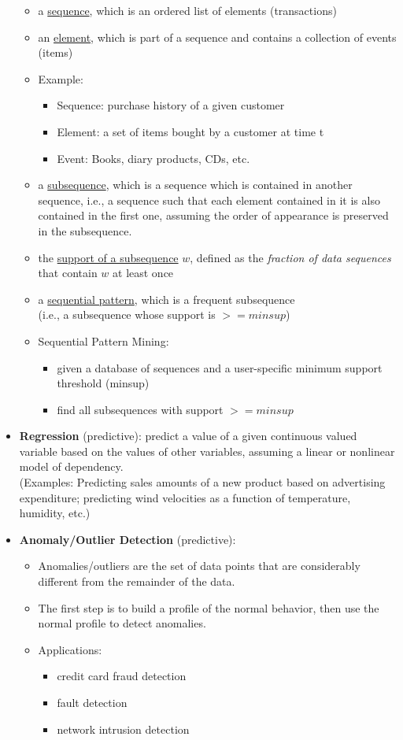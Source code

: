 \documentclass[10pt,a4paper]{article}
\begin{document}
\begin{justify}
\begin{itemize}
	\begin{itemize}
		\item a \uline{sequence}, which is an ordered list of elements (transactions)
		\item an \uline{element}, which is part of a sequence and contains a collection of events (items)
		\item Example:
		\begin{itemize}
			\item Sequence: purchase history of a given customer
			\item Element: a set of items bought by a customer at time t
			\item Event: Books, diary products, CDs, etc.
		\end{itemize}
		\item a \uline{subsequence}, which is a sequence which is contained in another sequence, i.e., a sequence such that each element contained in it is also contained in the first one, assuming the order of appearance is preserved in the subsequence.
		\item the \uline{support of a subsequence} $w$, defined as the \textit{fraction of data sequences} that contain $w$ at least once
		\item a \uline{sequential pattern}, which is a frequent subsequence \\(i.e., a subsequence whose support is $>= minsup$) 
		\item Sequential Pattern Mining:
		\begin{itemize}
			\item given a database of sequences and a user-specific minimum support threshold (minsup)
			\item find all subsequences with support $>= minsup$
		\end{itemize}
\end{itemize}		
	\item \textbf{Regression} (predictive): predict a value of a given continuous valued variable based on the values of other variables, assuming a linear or nonlinear model of dependency. \\ 
	(Examples: Predicting sales amounts of a new product based on advertising expenditure; predicting wind velocities as a function of temperature, humidity, etc.)
	\item \textbf{Anomaly/Outlier Detection} (predictive): 
	\begin{itemize}
		\item Anomalies/outliers are the set of data points that are considerably different from the remainder of the data. 
		\item  The first step is to build a profile of the normal behavior, then use the normal profile to detect anomalies.
		\item Applications: 
		\begin{itemize}
			\item credit card fraud detection
			\item fault detection
			\item network intrusion detection
		\end{itemize}
	\end{itemize}	
\end{itemize}

\end{justify}
\end{document}
